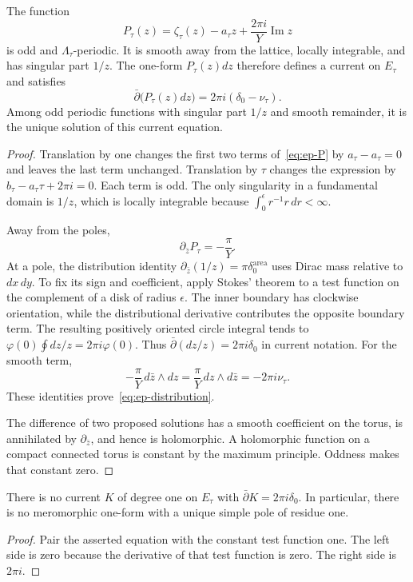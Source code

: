 \begin{theorem}\label{thm:ep-kernel}
The function
\begin{equation}\label{eq:ep-P}
 P_\tau(z)=\zeta_\tau(z)-a_\tau z+
                  \frac{2\pi i}{Y}\operatorname{Im}z
\end{equation}
is odd and $\Lambda_\tau$-periodic.
It is smooth away from the lattice, locally integrable, and has singular part $1/z$.
The one-form $P_\tau(z)dz$ therefore defines a current on $E_\tau$ and satisfies
\begin{equation}\label{eq:ep-distribution}
 \bar\partial\bigl(P_\tau(z)dz\bigr)
       =2\pi i(\delta_0-\nu_\tau).
\end{equation}
Among odd periodic functions with singular part $1/z$ and smooth remainder, it is the unique solution of this current equation.
\end{theorem}
\begin{proof}
Translation by one changes the first two terms of~\eqref{eq:ep-P} by $a_\tau-a_\tau=0$ and leaves the last term unchanged.
Translation by $\tau$ changes the expression by
$b_\tau-a_\tau\tau+2\pi i=0$.
Each term is odd.
The only singularity in a fundamental domain is $1/z$, which is locally integrable because $\int_0^\epsilon r^{-1}r\,dr<\infty$.

Away from the poles,
\[
 \partial_{\bar z}P_\tau=-\frac{\pi}{Y}.
\]
At a pole, the distribution identity
$\partial_{\bar z}(1/z)=\pi\delta^{\mathrm{area}}_0$ uses Dirac mass relative to $dx\,dy$.
To fix its sign and coefficient, apply Stokes' theorem to a test function on the complement of a disk of radius $\epsilon$.
The inner boundary has clockwise orientation, while the distributional derivative contributes the opposite boundary term.
The resulting positively oriented circle integral tends to
$\varphi(0)\oint dz/z=2\pi i\varphi(0)$.
Thus $\bar\partial(dz/z)=2\pi i\delta_0$ in current notation.
For the smooth term,
\[
 -\frac{\pi}{Y}\,d\bar z\wedge dz
 =\frac{\pi}{Y}\,dz\wedge d\bar z
 =-2\pi i\nu_\tau.
\]
These identities prove~\eqref{eq:ep-distribution}.

The difference of two proposed solutions has a smooth coefficient on the torus, is annihilated by $\partial_{\bar z}$, and hence is holomorphic.
A holomorphic function on a compact connected torus is constant by the maximum principle.
Oddness makes that constant zero.
\end{proof}

\begin{corollary}\label{cor:ep-constant}
There is no current $K$ of degree one on $E_\tau$ with
$\bar\partial K=2\pi i\delta_0$.
In particular, there is no meromorphic one-form with a unique simple pole of residue one.
\end{corollary}
\begin{proof}
Pair the asserted equation with the constant test function one.
The left side is zero because the derivative of that test function is zero.
The right side is $2\pi i$.
\end{proof}

